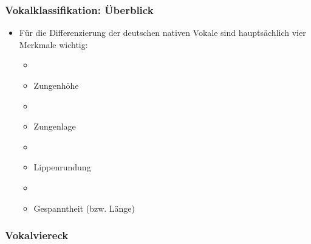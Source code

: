 
\begin{frame}
\frametitle{Vokalklassifikation: Überblick}

	\begin{itemize}
		\item Für die Differenzierung der deutschen nativen Vokale sind hauptsächlich vier Merkmale wichtig:
		
		\begin{itemize}
			\item[]
			\item Zungenhöhe
			\item[]
			\item Zungenlage
			\item[]
			\item Lippenrundung
			\item[]
			\item Gespanntheit (bzw. Länge)
		\end{itemize}
		
	\end{itemize}
	
\end{frame}


%
\subsubsection{Vokalviereck}

